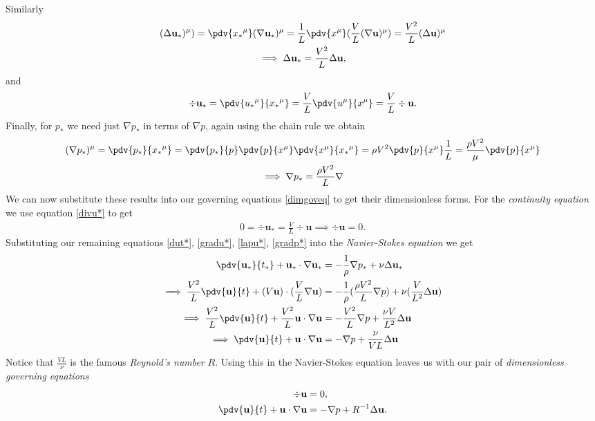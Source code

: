 Similarly
\begin{gather}
    (\Delta \mathbf{u_*})^\mu) = \pdv{{x_*}^\mu} (\nabla \mathbf{u_*})^\mu = \frac{1}{L} \pdv{x^\mu}(\frac{V}{L} (\nabla \mathbf{u})^\mu) = \frac{V^2}{L} (\Delta \mathbf{u})^\mu \nonumber\\
    \implies \Delta \mathbf{u_*} = \frac{V^2}{L} \Delta \mathbf{u},
\label{lapu*}
\end{gather}
and
\begin{gather}
    \div{\mathbf{u_*}} = \pdv{{u_*}^\mu}{{x_*}^\mu} = \frac{V}{L} \pdv{u^\mu}{x^\mu} = \frac{V}{L} \div{\mathbf{u}}.
\label{divu*}
\end{gather}
Finally, for $ p_* $ we need just $ \nabla p_* $ in terms of $ \nabla p $, again using the chain rule we obtain
\begin{gather}
    (\nabla p_*)^\mu = \pdv{p_*}{{x_*}^\mu} = \pdv{p_*}{p} \pdv{p}{x^\mu} \pdv{x^\mu}{{x_*}^\mu} = \rho V^2 \pdv{p}{x^\mu} \frac{1}{L} = \frac{\rho V^2}{\mu} \pdv{p}{x^\mu} \nonumber\\
    \implies \nabla p_* = \frac{\rho V^2}{L} \nabla 
\label{gradp*}
\end{gather}
We can now substitute these results into our governing equations \eqref{dimgoveq} to get their dimensionless forms. For the \emph{continuity equation} we use equation \eqref{divu*} to get
\begin{gather}
    0 = \div{\mathbf{u_*}} = \frac{V}{L} \div{\mathbf{u}} \implies \div{\mathbf{u}} = 0.
\end{gather}
Substituting our remaining equations \eqref{dut*}, \eqref{gradu*}, \eqref{lapu*}, \eqref{gradp*} into the \emph{Navier-Stokes equation} we get
\begin{align}
        \pdv{\mathbf{u_*}}{t_*} + \mathbf{u_*} \cdot \nabla \mathbf{u_*} &= - \frac{1}{\rho} \nabla p_* + \nu \Delta \mathbf{u_*} \nonumber\\
        \implies \frac{V^2}{L} \pdv{\mathbf{u}}{t} + (V \mathbf{u}) \cdot (\frac{V}{L}\nabla \mathbf{u}) &= - \frac{1}{\rho} (\frac{\rho V^2}{L} \nabla p) + \nu (\frac{V}{L^2} \Delta \mathbf{u}) \nonumber\\
        \implies \frac{V^2}{L} \pdv{\mathbf{u}}{t} + \frac{V^2}{L} \mathbf{u} \cdot \nabla \mathbf{u} &= -\frac{V^2}{L} \nabla p + \frac{\nu V}{L^2} \Delta \mathbf{u} \nonumber\\
        \implies \pdv{\mathbf{u}}{t} + \mathbf{u} \cdot \nabla \mathbf{u} &= -\nabla p + \frac{\nu}{V L} \Delta \mathbf{u}
\end{align}
Notice that $ \frac{V L}{\nu} $ is the famous \emph{Reynold's number} $ R $. Using this in the Navier-Stokes equation leaves us with our pair of \emph{dimensionless governing equations}
\begin{align}
    \div{\mathbf{u}} &= 0, \nonumber\\
    \pdv{\mathbf{u}}{t} + \mathbf{u} \cdot \nabla \mathbf{u} &= -\nabla p + R^{-1} \Delta \mathbf{u}.
\label{dlessgoveq}
\end{align}

